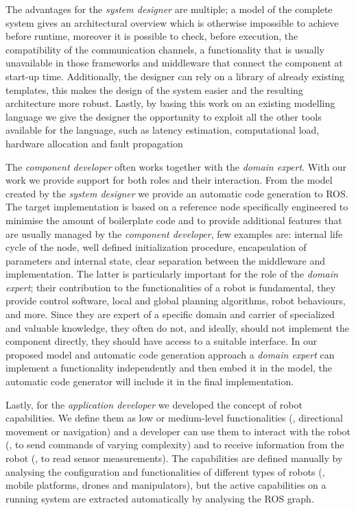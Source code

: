 The advantages for the \textit{system designer} are multiple; a model of the complete system gives an architectural overview which is otherwise impossible to achieve before runtime, moreover it is possible to check, before execution, the compatibility of the communication channels, a functionality that is usually unavailable in those frameworks and middleware that connect the component at start-up time. Additionally, the designer can rely on a library of already existing templates, this makes the design of the system easier and the resulting architecture more robust. Lastly, by basing this work on an existing modelling language we give the designer the opportunity to exploit all the other tools available for the language, such as latency estimation, computational load, hardware allocation and fault propagation

The \textit{component developer} often works together with the \textit{domain expert}. With our work we provide support for both roles and their interaction. From the model created by the \textit{system designer} we provide an automatic code generation to ROS. The target implementation is based on a reference node specifically engineered to minimise the amount of boilerplate code and to provide additional features that are usually managed by the \textit{component developer}, few examples are: internal life cycle of the node, well defined initialization procedure, encapsulation of parameters and internal state, clear separation between the middleware and implementation. The latter is particularly important for the role of the \textit{domain expert}; their contribution to the functionalities of a robot is fundamental, they provide control software, local and global planning algorithms, robot behaviours, and more. Since they are expert of a specific domain and carrier of specialized and valuable knowledge, they often do not, and ideally, should not implement the component directly, they should have access to a suitable interface. In our proposed model and automatic code generation approach a \textit{domain expert} can implement a functionality independently and then embed it in the model, the automatic code generator will include it in the final implementation.

Lastly, for the \textit{application developer} we developed the concept of robot capabilities. We define them as low or medium-level functionalities (\eg, directional movement or navigation) and a developer can use them to interact with the robot (\ie, to send commands of varying complexity) and to receive information from the robot (\ie, to read sensor measurements). The capabilities are defined manually by analysing the configuration and functionalities of different types of robots (\ie, mobile platforms, drones and manipulators), but the active capabilities on a running system are extracted automatically by analysing the ROS graph.

